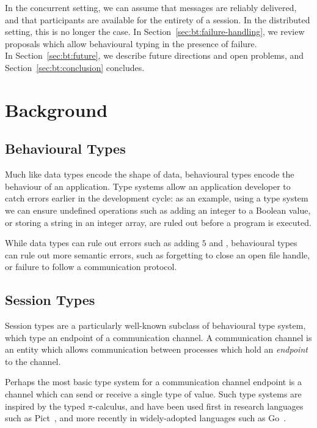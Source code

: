 \documentclass[
graybox,
envcountchap
]{svmult}
\begin{document}
\begin{bibunit}
      In the concurrent setting, we can assume that messages are reliably
      delivered, and that participants are available for the entirety of a
      session. In the distributed setting, this is no longer the case. In
      Section~\ref{sec:bt:failure-handling}, we review proposals which allow
      behavioural typing in the presence of failure. \\


  In Section~\ref{sec:bt:future}, we describe future directions and open
  problems, and Section~\ref{sec:bt:conclusion} concludes.

  \section{Background}\label{sec:bt:background}
  \subsection{Behavioural Types}

  Much like data types encode the shape of data, behavioural types encode the
  behaviour of an application. Type systems allow an application developer to
  catch errors earlier in the development cycle: as an example, using a type
  system we can ensure undefined operations such as adding an integer to a
  Boolean value, or storing a string in an integer array, are ruled out before a
  program is executed.

  While data types can rule out errors such as adding $5$ and ,
  behavioural types can rule out more semantic errors, such as forgetting to
  close an open file handle, or failure to follow a communication protocol.

  \subsection{Session Types}
  Session types are a particularly well-known subclass of behavioural type
  system, which type an endpoint of a communication channel. A communication
  channel is an entity which allows communication between processes which hold
  an \emph{endpoint} to the channel.

  Perhaps the most basic type system for a communication channel endpoint is a
  channel which can send or receive a single type of value. Such type systems
  are inspired by the typed $\pi$-calculus, and have been used first in research
  languages such as Pict~\cite{PierceT00:pict}, and more recently in
  widely-adopted languages such as Go~\cite{DonovanK15:go}.


\end{bibunit}
\end{document}
